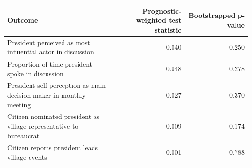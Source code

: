 \begin{table}[ht]
\centering
\begin{tabular}{lrr}
  \hline
Outcome & Prognostic-weighted test statistic & Bootstrapped p-value \\ 
  \hline
President perceived as most influential actor in discussion & 0.040 & 0.250 \\ 
  Proportion of time president spoke in discussion & 0.048 & 0.278 \\ 
  President self-perception as main decision-maker in monthly meeting & 0.027 & 0.370 \\ 
  Citizen nominated president as village representative to bureaucrat & 0.009 & 0.174 \\ 
  Citizen reports president leads village events & 0.001 & 0.788 \\ 
   \hline
\end{tabular}
\end{table}
